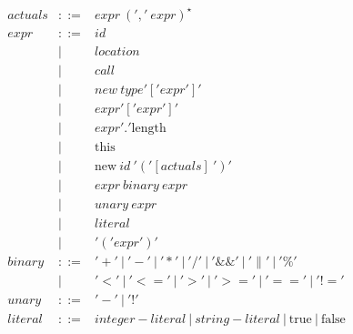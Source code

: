 \documentclass{article}
\begin{document}
$$\begin{array}{rcl}
 actuals & ::= & expr ~(','~expr)^{\star}\\
 expr & ::= & id \\
 & | & location\\
 & | & call\\
 & | & new ~ type '[' expr ']'\\
 & | & expr '[' expr ']'\\
 & | & expr'.'\textrm{length}\\
 & | & \textrm{this} \\
 & | & \textrm{new} ~id ~'('[actuals]~')' \\
 & | & expr ~binary ~expr\\
 & | & unary ~expr\\
 & | & literal\\
 & | & '('expr')'\\
 binary & ::= & '+' ~|~ '-' ~|~ '*' ~|~ '/' ~|~ '\&\&' ~|~ '\|' ~|~ '\%' \\
 & | &  '<' ~|~ '<=' ~|~ '>' ~|~ '>=' ~|~ '==' ~|~ '!=' \\
 unary & ::= & '-' ~|~ '!' \\
 literal & ::= & integer-literal ~|~ string-literal ~|~ \textrm{true} ~|~ \textrm{false} \\
\end{array}
$$



{\footnotesize 

}

\end{document}
